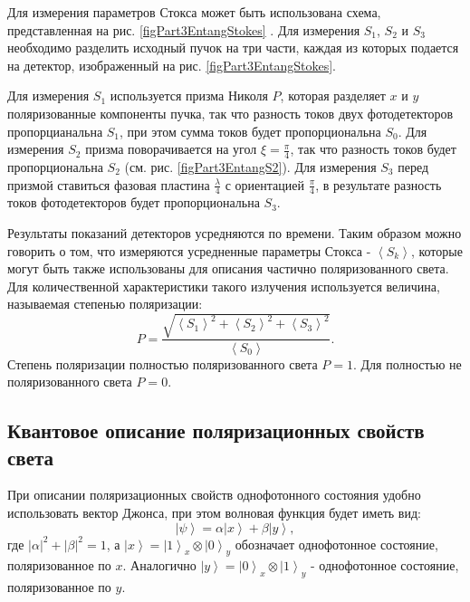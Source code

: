 

Для измерения параметров Стокса может быть использована схема,
представленная на рис. \ref{figPart3EntangStokes}
\cite{bEntangKlyshko}. Для измерения $S_1$, $S_2$ и $S_3$ необходимо
разделить исходный пучок на три части, каждая из которых подается на
детектор, изображенный на рис. \ref{figPart3EntangStokes}.



Для измерения $S_1$ используется призма Николя $P$, которая разделяет 
$x$ и $y$ поляризованные компоненты пучка,
так что разность токов двух фотодетекторов пропорцианальна $S_1$, при
этом сумма токов будет пропорциональна $S_0$. 
Для измерения $S_2$ призма поворачивается на угол $\xi =
\frac{\pi}{4}$, так что разность токов будет пропорциональна $S_2$
(см. рис. \ref{figPart3EntangS2}). 
Для измерения $S_3$ перед призмой ставиться фазовая пластина
$\frac{\lambda}{4}$ с ориентацией $\frac{\pi}{4}$, в результате
разность токов фотодетекторов будет пропорциональна $S_3$.

Результаты показаний детекторов усредняются по времени. Таким образом можно
говорить о том, что измеряются усредненные параметры Стокса - 
$\left<S_k\right>$, которые могут быть также использованы для описания
частично поляризованного света. Для количественной характеристики
такого излучения используется величина, называемая
степенью поляризации:
\begin{equation}
P = \frac{\sqrt{\left<S_1\right>^2 + \left<S_2\right>^2 +
    \left<S_3\right>^2}}{\left<S_0\right>}.
\label{eqEntangPolyarDegree}
\nonumber
\end{equation}
Степень поляризации полностью поляризованного света $P = 1$. Для  полностью не
поляризованного света $P = 0$.

\subsection{Квантовое описание поляризационных свойств света}
При описании поляризационных свойств однофотонного состояния удобно
использовать вектор Джонса, при этом волновая функция будет иметь вид:
\begin{equation}
\left|\psi\right> = 
\alpha \left|x\right> + 
\beta \left|y\right>,
\label{eqEntangSimpleState}
\end{equation}
где $\left|\alpha\right|^2 + \left|\beta\right|^2 = 1$, а
$\left|x\right> = \left|1\right>_x\otimes\left|0\right>_y$ обозначает
однофотонное состояние, поляризованное по $x$. Аналогично 
$\left|y\right> = \left|0\right>_x\otimes\left|1\right>_y$ -
однофотонное состояние, поляризованное по $y$. 


